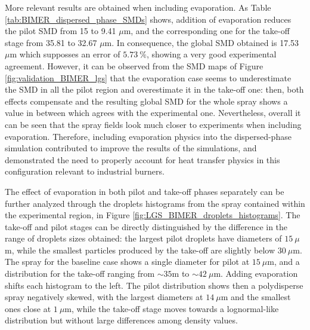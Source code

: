 More relevant results are obtained when including evaporation. As Table \ref{tab:BIMER_dispersed_phase_SMDs} shows, addition of evaporation reduces the pilot SMD from 15 to 9.41 $\mu$m, and the corresponding one for the take-off stage from 35.81 to 32.67 $\mu$m. In consequence, the global SMD obtained is 17.53 $\mu$m which supposses an error of $5.73~\%$, showing a very good experimental agreement. However, it can be observed from the SMD maps of Figure \ref{fig:validation_BIMER_lgs} that the evaporation case seems to underestimate the SMD in all the pilot region and overestimate it in the take-off one: then, both effects compensate and the resulting global SMD for the whole spray shows a value in between which agrees with the experimental one. Nevertheless, overall it can be seen that the spray fields look much closer to experiments when including evaporation. Therefore, including evaporation physics into the dispersed-phase simulation contributed to improve the results of the simulations, and demonstrated the need to properly account for heat transfer physics in this configuration relevant to industrial burners.




The effect of evaporation in both pilot and take-off phases separately can be further analyzed through the droplets histograms from the spray contained within the experimental region, in Figure \ref{fig:LGS_BIMER_droplets_histograms}. The take-off and pilot stages can be directly distinguished by the difference in the range of droplets sizes obtained: the largest pilot droplets have diameters of $15~\mu$m, while the smallest particles produced by the take-off are slightly below $30~\mu$m. The spray for the baseline case shows a single diameter for pilot at $15~\mu$m, and a distribution for the take-off ranging from $\sim 35$m to $\sim 42~\mu$m. Adding evaporation shifts each histogram to the left. The pilot distribution shows then a polydisperse spray negatively skewed, with the largest diameters at $14~\mu$m and the smallest ones close at $1~\mu$m, while the take-off stage moves towards a lognormal-like distribution but without large differences among density values.





